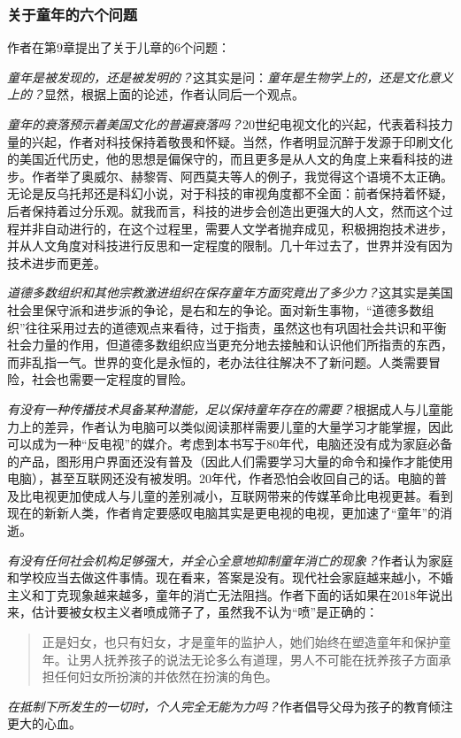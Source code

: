 \subsubsection{关于童年的六个问题}
作者在第9章提出了关于儿章的6个问题：
\begin{itemize*}
	\item \emph{童年是被发现的，还是被发明的？}这其实是问：\emph{童年是生物学上的，还是文化意义上的？}显然，根据上面的论述，作者认同后一个观点。
	\item \emph{童年的衰落预示着美国文化的普遍衰落吗？}20世纪电视文化的兴起，代表着科技力量的兴起，作者对科技保持着敬畏和怀疑。当然，作者明显沉醉于发源于印刷文化的美国近代历史，他的思想是偏保守的，而且更多是从人文的角度上来看科技的进步。作者举了奥威尔、赫黎胥、阿西莫夫等人的例子，我觉得这个语境不太正确。无论是反乌托邦还是科幻小说，对于科技的审视角度都不全面：前者保持着怀疑，后者保持着过分乐观。就我而言，科技的进步会创造出更强大的人文，然而这个过程并非自动进行的，在这个过程里，需要人文学者抛弃成见，积极拥抱技术进步，并从人文角度对科技进行反思和一定程度的限制。几十年过去了，世界并没有因为技术进步而更差。
	\item \emph{道德多数组织和其他宗教激进组织在保存童年方面究竟出了多少力？}这其实是美国社会里保守派和进步派的争论，是右和左的争论。面对新生事物，“道德多数组织”往往采用过去的道德观点来看待，过于指责，虽然这也有巩固社会共识和平衡社会力量的作用，但道德多数组织应当更充分地去接触和认识他们所指责的东西，而非乱指一气。世界的变化是永恒的，老办法往往解决不了新问题。人类需要冒险，社会也需要一定程度的冒险。
	\item \emph{有没有一种传播技术具备某种潜能，足以保持童年存在的需要？}根据成人与儿童能力上的差异，作者认为电脑可以类似阅读那样需要儿童的大量学习才能掌握，因此可以成为一种“反电视”的媒介。考虑到本书写于80年代，电脑还没有成为家庭必备的产品，图形用户界面还没有普及（因此人们需要学习大量的命令和操作才能使用电脑），甚至互联网还没有被发明。20年代，作者恐怕会收回自己的话。电脑的普及比电视更加使成人与儿童的差别减小，互联网带来的传媒革命比电视更甚。看到现在的新新人类，作者肯定要感叹电脑其实是更电视的电视，更加速了“童年”的消逝。
	\item \emph{有没有任何社会机构足够强大，并全心全意地抑制童年消亡的现象？}作者认为家庭和学校应当去做这件事情。现在看来，答案是没有。现代社会家庭越来越小，不婚主义和丁克现象越来越多，童年的消亡无法阻挡。作者下面的话如果在2018年说出来，估计要被女权主义者喷成筛子了，虽然我不认为“喷”是正确的：
	\begin{quotation}
正是妇女，也只有妇女，才是童年的监护人，她们始终在塑造童年和保护童年。让男人抚养孩子的说法无论多么有道理，男人不可能在抚养孩子方面承担任何妇女所扮演的并依然在扮演的角色。
\end{quotation}
	\item \emph{在抵制下所发生的一切时，个人完全无能为力吗？}作者倡导父母为孩子的教育倾注更大的心血。
\end{itemize*}

